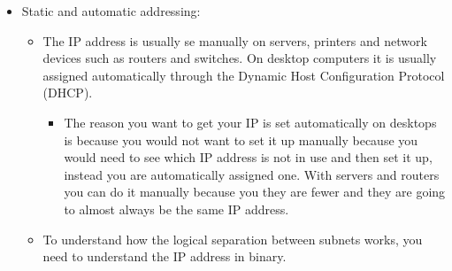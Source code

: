 \begin{itemize}
    \item Static and automatic addressing:
        \begin{itemize}
            \item The IP address is usually se manually on servers, printers and network devices such as routers and switches. On desktop computers it is usually assigned automatically through the Dynamic Host Configuration Protocol (DHCP).
                \begin{itemize}
                    \item The reason you want to get your IP is set automatically on desktops is because you would not want to set it up manually because you would need to see which IP address is not in use and then set it up, instead you are automatically assigned one. With servers and routers you can do it manually because you they are fewer and they are going to almost always be the same IP address.
                \end{itemize}
            \item To understand how the logical separation between subnets works, you need to understand the IP address in binary.
        \end{itemize}
\end{itemize}


